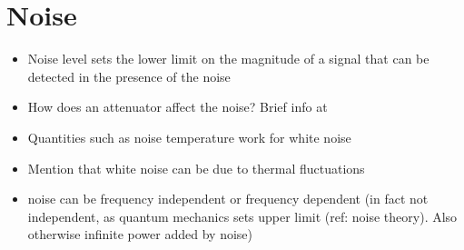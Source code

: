\documentclass[12pt]{report}
\begin{document}



















\chapter{Noise}




\begin{itemize}
    \item Noise level sets the lower limit on the magnitude of a signal that can be detected in the presence of the noise
    \item How does an attenuator affect the noise? Brief info at \cite[p.~4]{Iulian}
    \item Quantities such as noise temperature work for white noise
    \item Mention that white noise can be due to thermal fluctuations
    \item noise can be frequency independent or frequency dependent (in fact not independent, as quantum mechanics sets upper limit (ref: noise theory). Also otherwise infinite power added by noise)
\end{itemize}
\end{document}
